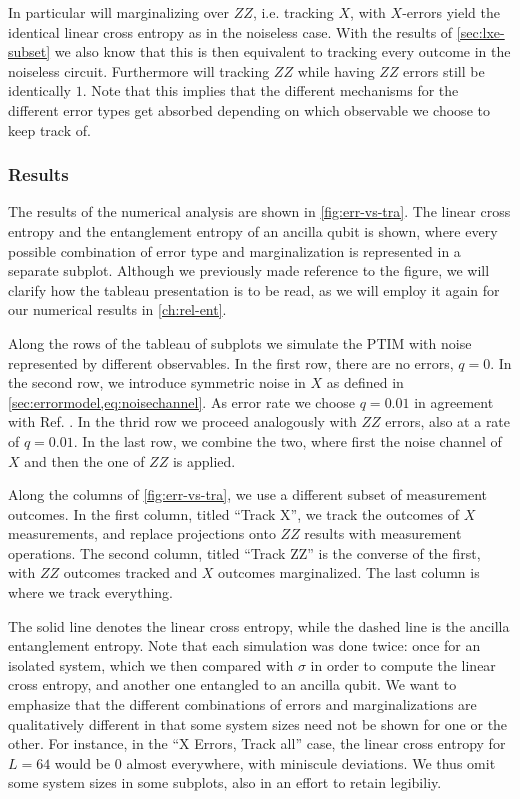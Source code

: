 In particular will marginalizing over $ZZ$, i.e. tracking $X$, with $X$-errors
yield the identical linear cross entropy as in the noiseless case. With the
results of \cref{sec:lxe-subset} we also know that this is then equivalent to
tracking every outcome in the noiseless circuit.
Furthermore will tracking
$ZZ$ while having $ZZ$ errors still be identically $1$. 
Note that this implies that the different mechanisms for the different error
types get absorbed depending on which observable we choose to keep track of. 

\subsubsection{Results}
The results of the numerical analysis are shown in \cref{fig:err-vs-tra}. The
linear cross entropy and the entanglement entropy of an ancilla qubit is shown,
where every possible combination of error type and marginalization is represented in
a separate subplot. Although we previously made reference to the figure, we
will clarify how the tableau presentation is to be read, as we will employ it
again for our numerical results in \cref{ch:rel-ent}.

Along the rows of the
tableau of subplots we simulate the PTIM with noise represented by different
observables. In the first row, there are no errors, $q=0$. In the second row,
we introduce symmetric noise in $X$ as defined in
\cref{sec:errormodel,eq:noisechannel}. As error rate we choose $q=0.01$ in
agreement with Ref. \cite{tikhanovskayaUniversalityCrossEntropy2023}. In the
thrid row we proceed analogously with $ZZ$ errors, also at a rate of $q=0.01$.
In the last row, we combine the two, where first the noise channel of $X$ and
then the one of $ZZ$ is applied. 

Along the columns of \cref{fig:err-vs-tra}, we use a different subset of
measurement outcomes. In the first column, titled \enquote{Track X}, we track
the outcomes of $X$ measurements, and replace projections onto $ZZ$ results
with measurement operations. The second column, titled \enquote{Track ZZ} is
the converse of the first, with $ZZ$ outcomes tracked and $X$ outcomes
marginalized. The last column is where we track everything. 

The solid line denotes the linear cross entropy, while the dashed line is the
ancilla entanglement entropy. Note that each simulation was done twice: once
for an isolated system, which we then compared with $\sigma$ in order to
compute the linear cross entropy, and another one entangled to an ancilla
qubit.  We want to emphasize that the different combinations of errors and
marginalizations are qualitatively different in that some system sizes need not
be shown for one or the other. For instance, in the \enquote{X Errors, Track
all} case, the linear cross entropy for $L=64$ would be $0$ almost everywhere,
with miniscule deviations. We thus omit some system sizes in some subplots,
also in an effort to retain legibiliy.


